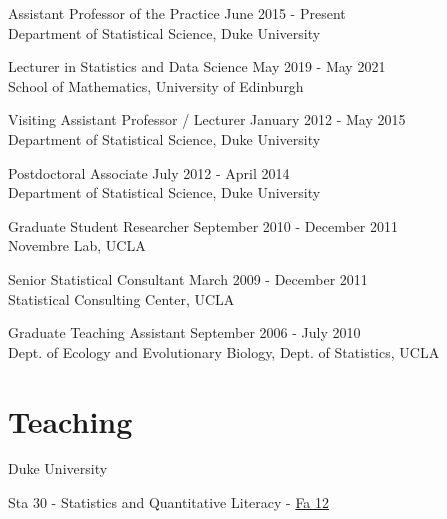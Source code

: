 \documentclass[margin,line]{res}
\begin{document}
\begin{resume}
Assistant Professor of the Practice \hfill June 2015 - Present \\
{Department of Statistical Science}, Duke University \\
\vspace{-0.5cm}

Lecturer in Statistics and Data Science \hfill May 2019 - May 2021 \\
{School of Mathematics}, University of Edinburgh \\
\vspace{-0.5cm}

Visiting Assistant Professor / Lecturer  \hfill January 2012 - May 2015 \\
{Department of Statistical Science}, Duke University \\
\vspace{-0.5cm}

Postdoctoral Associate  \hfill July 2012 - April 2014 \\
{Department of Statistical Science}, Duke University \\
\vspace{-0.5cm}

Graduate Student Researcher \hfill September 2010 - December 2011 \\
{Novembre Lab}, UCLA \\
\vspace{-0.5cm}

Senior Statistical Consultant \hfill March 2009 - December 2011 \\
{Statistical Consulting Center}, UCLA \\
\vspace{-0.50cm}

Graduate Teaching Assistant \hfill September 2006 - July 2010 \\
{Dept. of Ecology and Evolutionary Biology, Dept. of Statistics}, UCLA \\

\vspace{3mm}

\section{\sc Teaching}


Duke University

\begin{list1}
\item[] Sta 30 - Statistics and Quantitative Literacy - \href{http://stat.duke.edu/courses/Spring12/sta10.1}{Fa 12}


\end{list1}
\end{resume}
\end{document}
